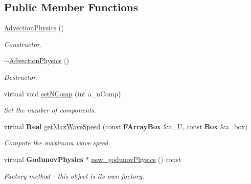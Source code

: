 \subsection*{Public Member Functions}
\begin{DoxyCompactItemize}
\item 
\mbox{\label{class_advection_physics_ac392278448ed29a685f9562f709a5b4b}} 
\hyperlink{class_advection_physics_ac392278448ed29a685f9562f709a5b4b}{Advection\+Physics} ()
\begin{DoxyCompactList}\small\item\em Constructor. \end{DoxyCompactList}\item 
\mbox{\label{class_advection_physics_a90f848be0b676fed24227e782aec2eb6}} 
\hyperlink{class_advection_physics_a90f848be0b676fed24227e782aec2eb6}{$\sim$\+Advection\+Physics} ()
\begin{DoxyCompactList}\small\item\em Destructor. \end{DoxyCompactList}\item 
\mbox{\label{class_advection_physics_ad50a0a57026615c8d7fd14d8e523f463}} 
virtual void \hyperlink{class_advection_physics_ad50a0a57026615c8d7fd14d8e523f463}{set\+N\+Comp} (int a\+\_\+n\+Comp)
\begin{DoxyCompactList}\small\item\em Set the number of components. \end{DoxyCompactList}\item 
\mbox{\label{class_advection_physics_a4305b9cac37f64a32c3db11a28068944}} 
virtual \textbf{ Real} \hyperlink{class_advection_physics_a4305b9cac37f64a32c3db11a28068944}{get\+Max\+Wave\+Speed} (const \textbf{ F\+Array\+Box} \&a\+\_\+U, const \textbf{ Box} \&a\+\_\+box)
\begin{DoxyCompactList}\small\item\em Compute the maximum wave speed. \end{DoxyCompactList}\item 
virtual \textbf{ Godunov\+Physics} $\ast$ \hyperlink{class_advection_physics_aa5be4c1a0a10aa2bbbe87fc6b032f2b4}{new\+\_\+godunov\+Physics} () const
\begin{DoxyCompactList}\small\item\em Factory method -\/ this object is its own factory. \end{DoxyCompactList}\item 

\end{DoxyCompactItemize}
